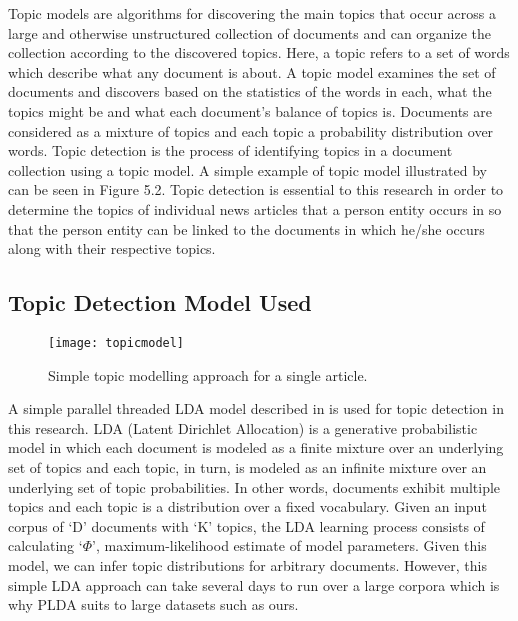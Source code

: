  Topic models are algorithms for discovering the main topics that occur across a large and otherwise 
unstructured collection of documents and can organize the collection according to the discovered topics.
Here, a topic refers to a set of words which describe what any document is about.
 A topic model examines the set of documents and discovers based on the statistics of the words in each, what the topics might be and what each document's balance of topics is.
Documents are considered as a mixture of topics and each topic a probability distribution over words.
 Topic detection is the process of identifying topics in a document collection using a topic model. A simple example of topic model illustrated by \cite{blei2012probabilistic} can be seen in Figure 5.2.
Topic detection is essential to this research in order to determine the topics of individual news articles that a person entity occurs in so that the person entity can be linked to the documents in which he/she occurs along with their respective topics.



\subsection{Topic Detection Model Used}


\begin{figure}[h]
\texttt{[image: topicmodel]}
\caption{Simple topic modelling approach for a single article\cite{blei2012probabilistic}.}
\end{figure} 

A simple parallel threaded LDA model described in \cite{newman2007distributed}  is used for topic detection in this research.
LDA (Latent Dirichlet Allocation) is a generative probabilistic model in which each document is modeled as a finite mixture over an underlying set of topics and each topic, in turn, is modeled as an infinite mixture over an underlying set of topic probabilities\cite{blei2003latent}. In other words, documents exhibit multiple topics and each topic is a distribution over a fixed vocabulary. 
Given an input corpus of `D' documents with `K' topics, the LDA learning process consists of calculating `${\Phi}$', 
maximum-likelihood estimate of model parameters. Given this model, we can infer
topic distributions for arbitrary documents.  
However, this simple LDA approach can take several days to run over a large corpora which is why PLDA suits to large datasets such as ours.


